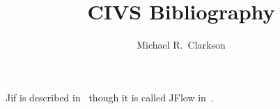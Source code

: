 \documentclass{article}
\title{CIVS Bibliography}
\author{Michael R.~Clarkson}
\begin{document}
\maketitle

Jif is described in~\cite{Myers99,jif,Clarkson10} though it is called
JFlow in~\cite{Myers99}.



\end{document}
